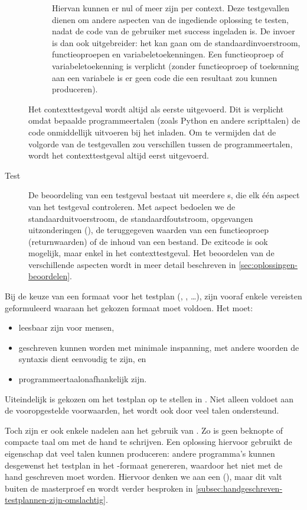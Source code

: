 \begin{description}
\begin{description}
        Hiervan kunnen er nul of meer zijn per context.
        Deze testgevallen dienen om andere aspecten van de ingediende oplossing te testen, nadat de code van de gebruiker met success ingeladen is.
        De invoer is dan ook uitgebreider: het kan gaan om de standaardinvoerstroom, functieoproepen en variabeletoekenningen.
        Een functieoproep of variabeletoekenning is verplicht (zonder functieoproep of toekenning aan een variabele is er geen code die een resultaat zou kunnen produceren).
    \end{description}
    Het contexttestgeval wordt altijd als eerste uitgevoerd.
    Dit is verplicht omdat bepaalde programmeertalen (zoals Python en andere scripttalen) de code onmiddellijk uitvoeren bij het inladen.
    Om te vermijden dat de volgorde van de testgevallen zou verschillen tussen de programmeertalen, wordt het contexttestgeval altijd eerst uitgevoerd.
    \item[Test] De beoordeling van een testgeval bestaat uit meerdere s, die elk één aspect van het testgeval controleren.
    Met aspect bedoelen we de standaarduitvoerstroom, de standaardfoutstroom, opgevangen uitzonderingen (), de teruggegeven waarden van een functieoproep (returnwaarden) of de inhoud van een bestand.
    De exitcode is ook mogelijk, maar enkel in het contexttestgeval.
    Het beoordelen van de verschillende aspecten wordt in meer detail beschreven in \cref{sec:oplossingen-beoordelen}.
\end{description}

Bij de keuze van een formaat voor het testplan (, , \ldots), zijn vooraf enkele vereisten geformuleerd waaraan het gekozen formaat moet voldoen.
Het moet:

\begin{itemize}
    \item leesbaar zijn voor mensen,
    \item geschreven kunnen worden met minimale inspanning, met andere woorden de syntaxis dient eenvoudig te zijn, en
    \item programmeertaalonafhankelijk zijn.
\end{itemize}

Uiteindelijk is gekozen om het testplan op te stellen in .
Niet alleen voldoet  aan de vooropgestelde voorwaarden, het wordt ook door veel talen ondersteund.

Toch zijn er ook enkele nadelen aan het gebruik van .
Zo is  geen beknopte of compacte taal om met de hand te schrijven.
Een oplossing hiervoor gebruikt de eigenschap dat veel talen  kunnen produceren: andere programma's kunnen desgewenst het testplan in het -formaat genereren, waardoor het niet met de hand geschreven moet worden.
Hiervoor denken we aan een  (), maar dit valt buiten de masterproef en wordt verder besproken in \cref{subsec:handgeschreven-testplannen-zijn-omslachtig}.

